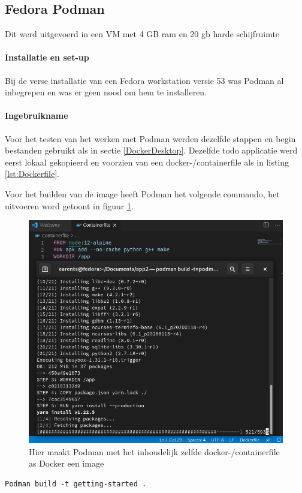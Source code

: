 \subsection{Fedora Podman}
Dit werd uitgevoerd in een VM met 4 GB ram en 20 gb harde schijfruimte
\paragraph{Installatie en set-up}
Bij de verse installatie van een Fedora workstation versie 53 was Podman al inbegrepen en was er geen nood om hem te installeren.

\paragraph{Ingebruikname}
Voor het testen van het werken met Podman werden dezelfde stappen en begin bestanden gebruikt als in sectie \ref{DockerDesktop}. Dezelfde todo applicatie werd eerst lokaal gekopieerd en voorzien van een docker-/containerfile als in listing \ref{lst:Dockerfile}.

Voor het builden van de image heeft Podman het volgende commando, het uitvoeren word getoont in figuur \ref{fig:podmanbuild}.
\begin{figure}[h]
    \includegraphics[width=\linewidth]{img/podmanbuild.png}
    \caption[Met podman een containerfile builden]{Hier maakt Podman met het inhoudelijk zelfde docker-/containerfile as Docker een image}
    \label{fig:podmanbuild}
    \centering
\end{figure}
\begin{verbatim}
Podman build -t getting-started .
\end{verbatim}
 

